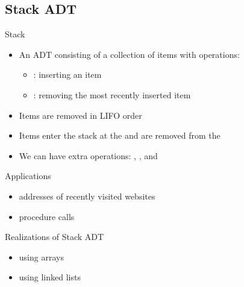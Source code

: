 \documentclass[letterpaper, 12pt]{article}
\newcommand{\red}[1]{{\color{red}{#1}}}
\begin{document}
    \subsection{Stack ADT}
    Stack
    \begin{itemize}
        \item An ADT consisting of a collection of items with operations:
        \begin{itemize}
            \item \red{push}: inserting an item 
            \item \red{pop}: removing the most recently inserted item
        \end{itemize}
        \item Items are removed in LIFO order
        \item Items enter the stack at the \red{top} and are removed from the \red{top}
        \item We can have extra operations: \red{size}, \red{isEmpty}, and \red{top}
    \end{itemize}
    Applications
    \begin{itemize}
        \item addresses of recently visited websites
        \item procedure calls
    \end{itemize}

    Realizations of Stack ADT
    \begin{itemize}
        \item using arrays
        \item using linked lists
    \end{itemize}
    \pagebreak
\end{document}
